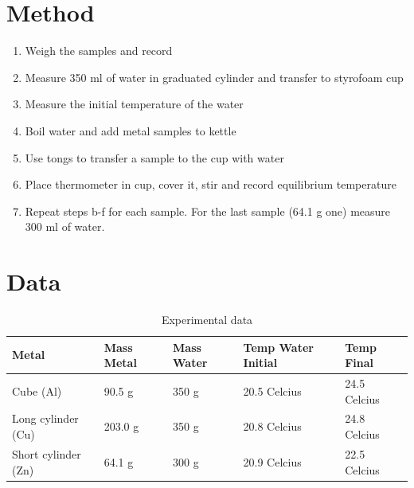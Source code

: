 \documentclass{article}
\begin{document}
\section{Method}

\begin{enumerate}
\item Weigh the samples and record
\item Measure 350 ml of water in graduated cylinder and transfer to styrofoam cup
\item Measure the initial temperature of the water
\item Boil water and add metal samples to kettle
\item Use tongs to transfer a sample to the cup with water
\item Place thermometer in cup, cover it, stir and record equilibrium temperature
\item Repeat steps b-f for each sample. For the last sample (64.1 g one) measure 300 ml of water. 

\end{enumerate}

\newpage

\section{Data}

\begin{table}[htbp]
\begin{center}
\footnotesize
\begin{tabular}{lllll}
\toprule
 Metal   & Mass Metal & Mass Water & Temp Water Initial & Temp Final \\                                                      
\midrule
  
    Cube (Al)   & 90.5 g  &350 g         & 20.5 Celcius & 24.5 Celcius   \\
    Long cylinder (Cu)     & 203.0 g    & 350 g       & 20.8 Celcius & 24.8 Celcius  \\
    Short cylinder (Zn)   & 64.1 g    &300 g       & 20.9 Celcius  & 22.5 Celcius  \\
    
\bottomrule
\end{tabular}
\end{center}
  \caption{Experimental data}
  \label{tab:font-sizes}
\end{table}
\end{document}
